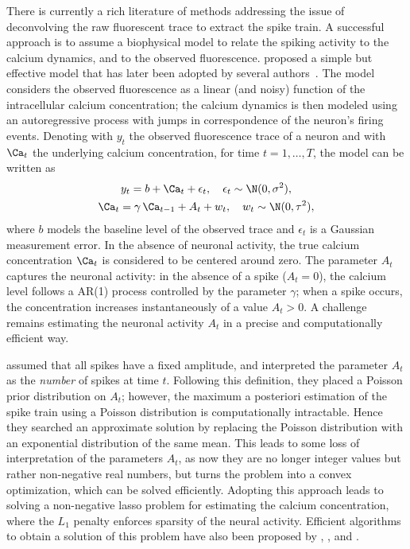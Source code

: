 There is currently a rich literature of methods addressing the issue of deconvolving the raw fluorescent trace to extract the spike train. A successful approach is to assume a biophysical model to relate the spiking activity to the calcium dynamics, and to the observed fluorescence. \citet{vogelstein2010} proposed a simple but effective model that has later been adopted by several authors~\citep{pnevmatikakis2016, friedrich2016, friedrich2017, jewell2018, jewell2019}. The model considers the observed fluorescence as a linear (and noisy) function of the intracellular calcium concentration; the calcium dynamics is then modeled using an autoregressive process with jumps in correspondence of the neuron's firing events.
Denoting with $y_t$ the observed fluorescence trace of a neuron and with $\Ca_t$ the underlying calcium concentration, for time $t=1,\dots,T$, the model can be written as
\begin{equation}
\begin{gathered}
y_t = b + \Ca_t + \epsilon_t,\quad \epsilon_t \sim \N(0,\sigma^2),  \\
\Ca_t = \gamma\, \Ca_{t-1} + A_t + w_t, \quad w_t \sim \N(0, \tau^2),
\end{gathered}
\label{ch1_eq:armodel}
\end{equation}
where $b$ models the baseline level of the observed trace and $\epsilon_t$ is a Gaussian measurement error. In the absence of neuronal activity, the true calcium concentration $\Ca_t$ is considered to be centered around zero. The parameter $A_t$ captures the neuronal activity: in the absence of a spike ($A_t = 0$), the calcium level follows a AR(1) process controlled by the parameter $\gamma$; when a spike occurs, the concentration increases instantaneously of a value $A_t > 0$.
A challenge remains estimating the neuronal activity $A_t$ in a precise and computationally efficient way.

\citet{vogelstein2010} assumed that all spikes have a fixed amplitude, and interpreted the parameter $A_t$ as the \textit{number} of spikes at time $t$. Following this definition, they placed a Poisson prior distribution on $A_t$; however, the maximum a posteriori estimation of the spike train using a Poisson distribution is computationally intractable. Hence they searched an approximate solution by replacing the Poisson distribution with an exponential distribution of the same mean. This leads to some loss of interpretation of the parameters $A_t$, as now they are no longer integer values but rather non-negative real numbers, but turns the problem into a convex optimization, which can be solved efficiently.
Adopting this approach leads to solving a non-negative lasso problem for estimating the calcium concentration, where the $L_1$ penalty enforces sparsity of the neural activity.
Efficient algorithms to obtain a solution of this problem have also been proposed by \citet{pnevmatikakis2016}, \citet{friedrich2016}, and \citet{friedrich2017}.

